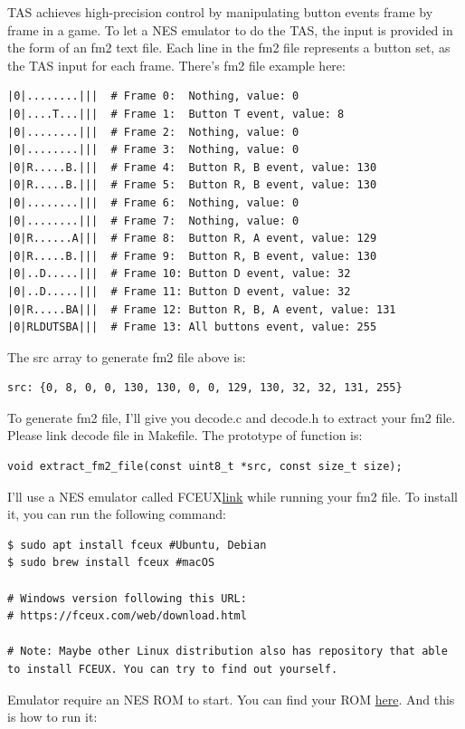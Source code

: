 \documentclass[a4paper,11pt]{article}
\begin{document}
TAS achieves high-precision control by manipulating button events frame by frame in a game. To let a NES emulator to do the TAS, the input is provided in the form of an fm2 text file. Each line in the fm2 file represents a button set, as the TAS input for each frame. There's fm2 file example here:

\begin{lstlisting}
|0|........|||  # Frame 0:  Nothing, value: 0
|0|....T...|||  # Frame 1:  Button T event, value: 8
|0|........|||  # Frame 2:  Nothing, value: 0
|0|........|||  # Frame 3:  Nothing, value: 0
|0|R.....B.|||  # Frame 4:  Button R, B event, value: 130
|0|R.....B.|||  # Frame 5:  Button R, B event, value: 130
|0|........|||  # Frame 6:  Nothing, value: 0
|0|........|||  # Frame 7:  Nothing, value: 0
|0|R......A|||  # Frame 8:  Button R, A event, value: 129
|0|R.....B.|||  # Frame 9:  Button R, B event, value: 130
|0|..D.....|||  # Frame 10: Button D event, value: 32
|0|..D.....|||  # Frame 11: Button D event, value: 32
|0|R.....BA|||  # Frame 12: Button R, B, A event, value: 131
|0|RLDUTSBA|||  # Frame 13: All buttons event, value: 255
\end{lstlisting}

The src array to generate fm2 file above is:
\begin{lstlisting}
src: {0, 8, 0, 0, 130, 130, 0, 0, 129, 130, 32, 32, 131, 255}
\end{lstlisting}

To generate fm2 file, I'll give you {\color{red}decode.c} and {\color{red}decode.h} to extract your fm2 file. {\color{red}Please link decode file in Makefile.} The prototype  of function is:
\begin{lstlisting}
void extract_fm2_file(const uint8_t *src, const size_t size);
\end{lstlisting}

I'll use a NES emulator called FCEUX{\href{https://fceux.com/web/home.html}{\tiny link}} while running your fm2 file. To install it, you can run the following command:
\begin{lstlisting}
$ sudo apt install fceux #Ubuntu, Debian
$ sudo brew install fceux #macOS

# Windows version following this URL:
# https://fceux.com/web/download.html

# Note: Maybe other Linux distribution also has repository that able to install FCEUX. You can try to find out yourself.
\end{lstlisting}

Emulator require an NES ROM to start. You can find your ROM {\href{https://github.com/seven7bits/7bits/blob/master/app/roms/Super%20Mario%20Bros.%20(JU)%20(PRG0)%20%5B!%5D.nes}{here}}. And this is how to run it:
\end{document}
